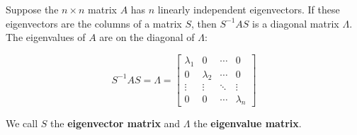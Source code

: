Suppose the \(n \times n\) matrix \(A\) has \(n\) linearly independent eigenvectors. If these eigenvectors are the columns of a matrix \(S\), then \(S^{-1}AS\) is a diagonal matrix \(\Lambda\). The eigenvalues of \(A\) are on the diagonal of \(\Lambda\):

\[
S^{-1}AS = \Lambda = \begin{bmatrix}
   \lambda_1       & 0  & \cdots  & 0  \\
  0  & \lambda_2 & \cdots  & 0 \\
  \vdots  & \vdots  & \ddots & \vdots \\
   0  & 0 & \cdots & \lambda_n
\end{bmatrix}
\]

We call \(S\) the \textbf{eigenvector matrix} and \(\Lambda\) the \textbf{eigenvalue matrix}.

